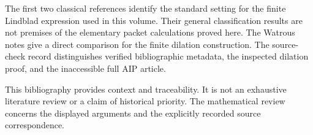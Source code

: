 The first two classical references identify the standard setting for the finite Lindblad expression used in this volume. Their general classification results are not premises of the elementary packet calculations proved here. The Watrous notes give a direct comparison for the finite dilation construction. The source-check record distinguishes verified bibliographic metadata, the inspected dilation proof, and the inaccessible full AIP article.

This bibliography provides context and traceability. It is not an exhaustive literature review or a claim of historical priority. The mathematical review concerns the displayed arguments and the explicitly recorded source correspondence.
